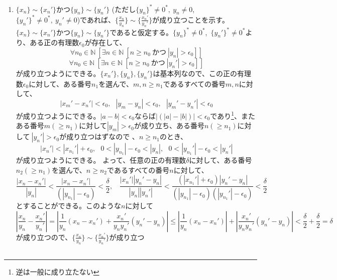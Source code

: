 \documentclass{jsarticle}
\begin{document}
\begin{enumerate}
\item
$\{x_n\}\sim\{x_n'\}$かつ$\{y_n\}\sim\{y_n'\}$ (ただし$\{y_n\}^*\neq 0^*,\ y_n\neq 0$,\ $\{y_n'\}^*\neq 0^*,\ y_n'\neq 0$)であれば、$\{\frac{x_n}{y_n}\}\sim\{\frac{x_n'}{y_n'}\}$が成り立つことを示す。\\
$\{x_n\}\sim\{x_n'\}$かつ$\{y_n\}\sim\{y_n'\}$であると仮定する。$\{y_n\}^*\neq 0^*$,\ $\{y_n'\}^*\neq 0^*$より、ある正の有理数$\epsilon_0$が存在して、
\[\forall n_0\in\mathbb{N}\ [\exists n\in\mathbb{N}\ [n\geq n_0\ かつ\ |y_n|>\epsilon_0]]\]
\[\forall n_0\in\mathbb{N}\ [\exists n\in\mathbb{N}\ [n\geq n_0\ かつ\ |y_n'|>\epsilon_0]]\]
が成り立つようにできる。$\{x_n'\},\{y_n\},\{y_n'\}$は基本列なので、この正の有理数$\epsilon_0$に対して、ある番号$n_1$を選んで、$m,n\geq n_1$であるすべての番号$m,n$に対して、
\[|x_m'-x_n'|<\epsilon_0,\ \ \ |y_m-y_n|<\epsilon_0,\ \ \ |y_m'-y_n'|<\epsilon_0\]
が成り立つようにできる。$|a-b|<\epsilon_0$ならば$|(|a|-|b|)|<\epsilon_0$であり\footnote{逆は一般に成り立たない}、またある番号$m(\geq n_1)$に対して$|y_m|>\epsilon_0$が成り立ち、ある番号$n(\geq n_1)$に対して$\ |y_n'|>\epsilon_0$が成り立つはずなので 、$n\geq n_1$のとき、
\[ |x_n'|<|x_{n_1}'|+\epsilon_0,\ \ \    0<|y_{n_1}|-\epsilon_0<|y_n|,\ \ \    0<|y_{n_1}'|-\epsilon_0<|y_n'|\]
が成り立つようにできる。
よって、任意の正の有理数$\delta$に対して、ある番号$n_2(\geq n_1)$を選んで、$n\geq n_2$であるすべての番号$n$に対して、
\[\frac{|x_n -x_n'|}{|y_n|} < \frac{|x_n-x_n'|}{(|y_{n_1}|-\epsilon_0)} <\frac{\delta}{2},\ \ \ \  
\frac{|x_n'||y_n'-y_n|}{|y_n||y_n'|}<\frac{(|x_{n_1}'|+\epsilon_0)|y_n'-y_n|}{(|y_{n_1}|-\epsilon_0)(|y_{n_1}'|-\epsilon_0)}<\frac{\delta}{2}\]
とすることができる。このような$n$に対して
\[|\frac{x_n}{y_n}-\frac{x_n'}{y_n'}|=|\frac{1}{y_n}(x_n-x_n')+\frac{x_n'}{y_n y_n'}(y_n'-y_n)|\leq|\frac{1}{y_n}(x_n-x_n')|+|\frac{x_n'}{y_n y_n'}(y_n'-y_n)|< \frac{\delta}{2}+\frac{\delta}{2}=\delta\]
が成り立つので、$\{\frac{x_n}{y_n}\}\sim\{\frac{x_n'}{y_n'}\}$が成り立つ

\end{enumerate}


\subsection{}
\end{document}

